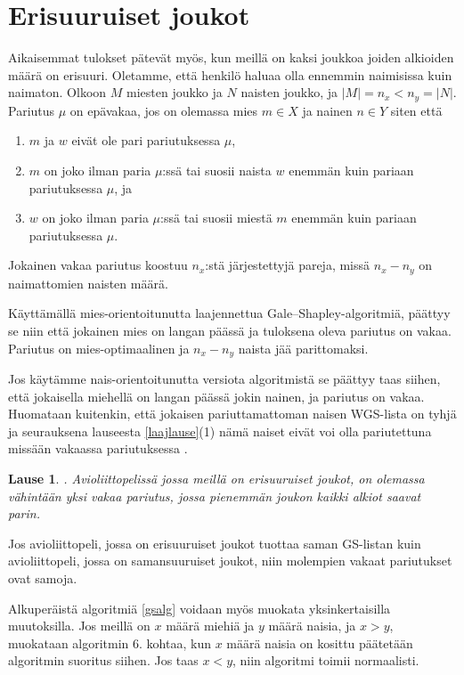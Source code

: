 \documentclass[finnish]{tktltiki2}
\newtheorem{lau}{Lause}
\theoremstyle{definition}
\theoremstyle{remark}
\begin{document}
\section{Erisuuruiset joukot}
Aikaisemmat tulokset pätevät myös, kun meillä on kaksi joukkoa joiden alkioiden määrä on erisuuri. Oletamme, että henkilö haluaa olla ennemmin naimisissa kuin naimaton.
Olkoon $M$ miesten joukko ja $N$ naisten joukko, ja $|M| = n_x < n_y = |N|$. Pariutus $\mu$ on epävakaa, jos on olemassa mies $m \in X$ ja nainen $n \in Y$ siten että

\begin{enumerate}
	\item $m$ ja $w$ eivät ole pari pariutuksessa $\mu$,
	\item $m$ on joko ilman paria $\mu$:ssä tai suosii naista $w$ enemmän kuin pariaan pariutuksessa $\mu$, ja
	\item $w$ on joko ilman paria $\mu$:ssä tai suosii miestä $m$ enemmän kuin pariaan pariutuksessa $\mu$.
\end{enumerate}
Jokainen vakaa pariutus koostuu $n_x$:stä järjestettyjä pareja, missä $n_x - n_y$ on naimattomien naisten määrä.

Käyttämällä mies-orientoitunutta laajennettua Gale--Shapley-algoritmiä, päättyy  se niin että jokainen mies on langan päässä ja tuloksena oleva pariutus on vakaa. Pariutus on mies-optimaalinen ja $n_x - n_y$ naista jää parittomaksi.

Jos käytämme nais-orientoitunutta versiota algoritmistä se päättyy taas siihen, että jokaisella miehellä on langan päässä jokin nainen, ja pariutus on vakaa. Huomataan kuitenkin, että jokaisen pariuttamattoman naisen WGS-lista on tyhjä ja seurauksena lauseesta \ref{laajlause}(1) nämä naiset eivät voi olla pariutettuna missään vakaassa pariutuksessa \cite[s. 26]{gusfield1989stable}.

\begin{lau}\cite[p. 26]{gusfield1989stable}.
Avioliittopelissä jossa meillä on erisuuruiset joukot, on olemassa vähintään yksi vakaa pariutus, jossa pienemmän joukon kaikki alkiot saavat parin.
\end{lau}
Jos avioliittopeli, jossa on erisuuruiset joukot tuottaa saman GS-listan kuin avioliittopeli, jossa on samansuuruiset joukot, niin molempien vakaat pariutukset ovat samoja.

Alkuperäistä algoritmiä \ref{gsalg} voidaan myös muokata yksinkertaisilla muutoksilla. Jos meillä on $x$ määrä miehiä ja $y$ määrä naisia, ja $x > y$, muokataan algoritmin 6. kohtaa, kun $x$ määrä naisia on kosittu päätetään algoritmin suoritus siihen. Jos taas $x < y$, niin algoritmi toimii normaalisti.
\end{document}
